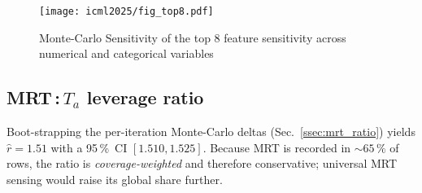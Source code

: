 \documentclass{article}
\theoremstyle{plain}
\theoremstyle{definition}
\theoremstyle{remark}
\begin{document}
\begin{figure}[h!]
    \centering
    \texttt{[image: icml2025/fig\_top8.pdf]}
    \caption{Monte-Carlo Sensitivity of the top 8 feature sensitivity across numerical and categorical variables}
    \label{fig:barh-top8}
\end{figure}

\subsection{MRT\,:\,$T_a$ leverage ratio}\label{ssec:ratio}
Boot-strapping the per-iteration Monte-Carlo deltas
(Sec.~\ref{ssec:mrt_ratio}) yields
$\hat{r}=1.51$ with a 95\,\%~CI
$[1.510,1.525]$.
Because MRT is recorded in $\sim\!65\,\%$ of rows, the ratio is \emph{coverage-weighted} and therefore conservative; universal MRT sensing would raise its global share further.

\end{document}
